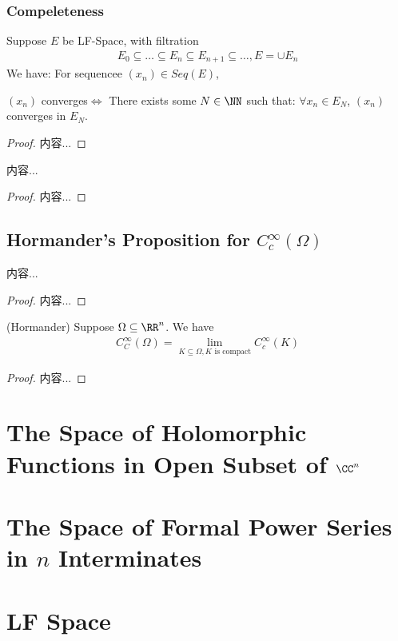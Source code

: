 \documentclass[Total.tex]{subfiles}
\begin{document}
	\subsubsection{Compeleteness}
	\begin{lemma}
		Suppose $E$ be LF-Space, with filtration
		\begin{gather*}
			E_0\subseteq\dots\subseteq E_n\subseteq E_{n+1}\subseteq \dots,E=\cup E_n
		\end{gather*}
		We have: For sequencee $(x_n)\in Seq(E)$,
		\begin{center}
			$(x_n)$ converges$\Leftrightarrow$ There exists some $N\in \NN$ such that: $\forall x_n\in E_N$, $(x_n)$ converges in $E_N$.
		\end{center}
	\end{lemma}
	\begin{proof}
		内容...
	\end{proof}
	\begin{proposition}
		内容...
	\end{proposition}
	\begin{proof}
		内容...
	\end{proof}
	\subsection{Hormander's Proposition for $C^\infty_c(\Omega)$}
		\begin{lemma}
			内容...
		\end{lemma}
		\begin{proof}
			内容...
		\end{proof}
		\begin{theorem}
			(Hormander) Suppose $\Omega\subseteq \RR^n$. We have
			\begin{gather*}
				C^\infty_C(\Omega)=\lim_{K\subseteq \Omega,K\mbox{ is compact}} C_c^\infty(K)
			\end{gather*}
		\end{theorem}
		\begin{proof}
			内容...
		\end{proof}
	\section{The Space of Holomorphic Functions in Open Subset of $\CC^n$}
	\section{The Space of Formal Power Series in $n$ Interminates}
	\section{LF Space}
\end{document}
